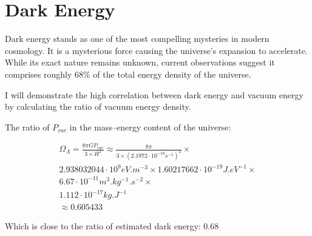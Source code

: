 \section{Dark Energy}

Dark energy stands as one of the most compelling mysteries in modern cosmology. It is a mysterious force causing the universe's expansion to accelerate.  While its exact nature remains unknown, current observations suggest it comprises roughly 68\% of the total energy density of the universe.

I will demonstrate the high correlation between dark energy and vacuum energy by calculating the ratio of vacuum energy density.

The ratio of \(P_{vac}\) in the mass–energy content of the universe:

\begin{equation}
\begin{aligned}
\Omega_{\Lambda} = \frac{8 \pi G P_{vac} }{3 \times H^{2}} \approx \frac{8 \pi}{3 \times (2.1972 \cdot 10^{-18} \si{s^{-1}})^2} \times \\
2.938032044 \cdot 10^{9} \si{eV.m^{-3}} \times 1.60217662 \cdot 10^{-19} \si{J.eV^{-1}} \times \\
6.67 \cdot 10^{-11} \si{m^{3}.kg^{-1}.s^{-2}} \times \\
1.112 \cdot 10^{-17} \si{kg.J^{-1}} \\
\approx 0.605433
\end{aligned}
\end{equation}

Which is close to the ratio of estimated dark energy: 0.68